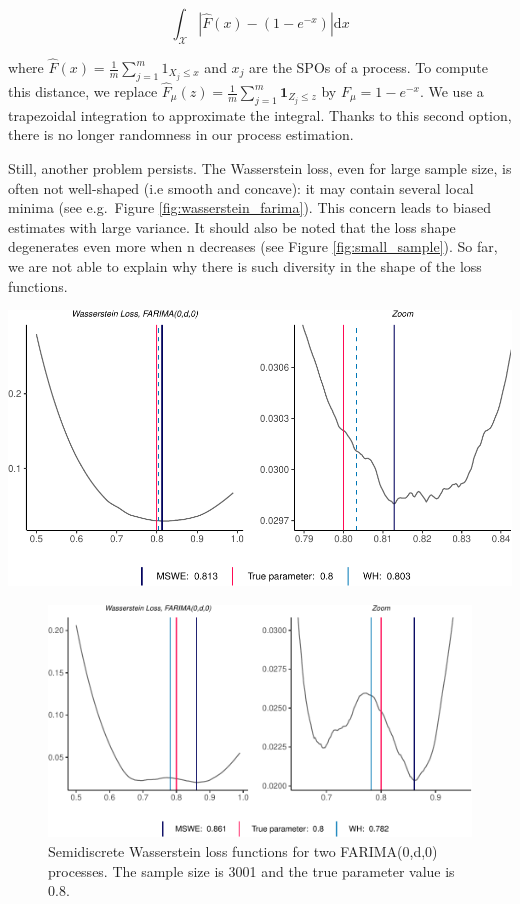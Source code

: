 \documentclass[
  11pt,
]{article}
\begin{document}
\begin{equation}
\int_\mathcal{X}\left|\hat F(x)- (1 - e^{-x})\right| \mathrm{d} x 
\end{equation}

where \(\hat F(x) = \frac{1}{m} \sum_{j=1}^{m} 1_{X_{j} \leq x}\) and
\(x_j\) are the SPOs of a process. To compute this distance, we replace
\(\hat F_\mu(z) = \frac{1}{m}\sum_{j=1}^{m} \mathbf{1}_{Z_{j} \leq z}\)
by \(F_\mu = 1 - e^{-x}\). We use a trapezoidal integration to
approximate the integral. Thanks to this second option, there is no
longer randomness in our process estimation.

Still, another problem persists. The Wasserstein loss, even for large
sample size, is often not well-shaped (i.e smooth and concave): it may
contain several local minima (see e.g.~Figure
\ref{fig:wasserstein_farima}). This concern leads to biased estimates
with large variance. It should also be noted that the loss shape
degenerates even more when n decreases (see Figure
\ref{fig:small_sample}). So far, we are not able to explain why there is
such diversity in the shape of the loss functions.

\begin{center}\includegraphics[width=0.6\linewidth]{Master_thesis_V1_files/figure-latex/unnamed-chunk-3-1} \end{center}

\begin{figure}

{\centering \includegraphics[width=0.6\linewidth]{Master_thesis_V1_files/figure-latex/semi_wass-1} 

}

\caption{Semidiscrete Wasserstein loss functions for two FARIMA(0,d,0) processes. The sample size is 3001 and the true parameter value is 0.8.}\label{fig:semi_wass}
\end{figure}
\end{document}
